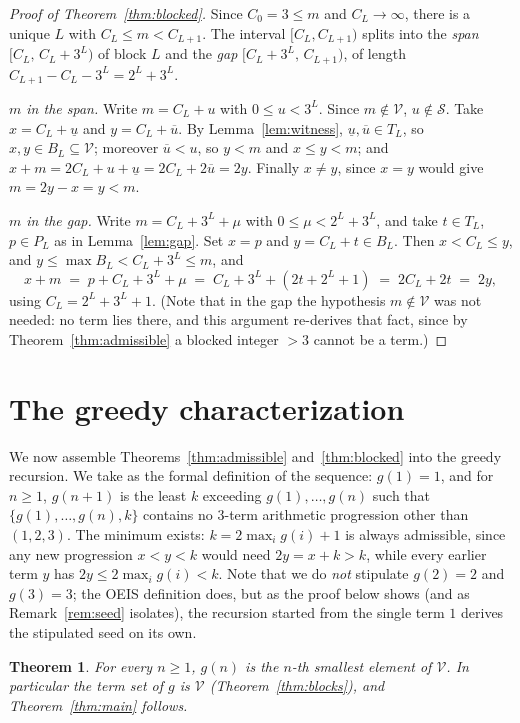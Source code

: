 \documentclass[12pt]{article}
\theoremstyle{plain}
\newtheorem{theorem}{Theorem}
\theoremstyle{definition}
\theoremstyle{remark}
\newcommand{\V}{\mathcal{V}}
\newcommand{\Sd}{\mathcal{S}}
\newcommand{\lo}[1]{\underline{#1}}
\newcommand{\hi}[1]{\overline{#1}}
\begin{document}
\begin{proof}[Proof of Theorem~\ref{thm:blocked}]
Since $C_0=3\leq m$ and $C_L\to\infty$, there is a unique $L$
with $C_L\leq m<C_{L+1}$.  The interval $[C_L,C_{L+1})$ splits
into the \emph{span} $[C_L,\,C_L+3^L)$ of block $L$ and the
\emph{gap} $[C_L+3^L,\,C_{L+1})$, of length
$C_{L+1}-C_L-3^L=2^L+3^L$.

\emph{$m$ in the span.}  Write $m=C_L+u$ with $0\leq u<3^L$.
Since $m\notin\V$, $u\notin\Sd$.  Take
$x=C_L+\lo{u}$ and $y=C_L+\hi{u}$.  By Lemma~\ref{lem:witness},
$\lo{u},\hi{u}\in T_L$, so $x,y\in B_L\subseteq\V$; moreover
$\hi{u}<u$, so $y<m$ and $x\leq y<m$; and
$x+m=2C_L+u+\lo{u}=2C_L+2\hi{u}=2y$.  Finally $x\neq y$, since
$x=y$ would give $m=2y-x=y<m$.

\emph{$m$ in the gap.}  Write $m=C_L+3^L+\mu$ with
$0\leq\mu<2^L+3^L$, and take $t\in T_L$, $p\in P_L$ as in
Lemma~\ref{lem:gap}.  Set $x=p$ and $y=C_L+t\in B_L$.  Then
$x<C_L\leq y$, and $y\leq\max B_L<C_L+3^L\leq m$, and
\[
x+m \;=\; p+C_L+3^L+\mu \;=\; C_L+3^L+(2t+2^L+1)
\;=\; 2C_L+2t \;=\; 2y,
\]
using $C_L=2^L+3^L+1$.  (Note that in the gap the hypothesis
$m\notin\V$ was not needed: no term lies there, and this argument
re-derives that fact, since by Theorem~\ref{thm:admissible} a
blocked integer $>3$ cannot be a term.)
\end{proof}

\section{The greedy characterization}\label{sec:greedy}

We now assemble Theorems~\ref{thm:admissible}
and~\ref{thm:blocked} into the greedy recursion.  We take as the
formal definition of the sequence: $g(1)=1$, and for $n\geq 1$,
$g(n+1)$ is the least $k$ exceeding $g(1),\ldots,g(n)$ such that
$\{g(1),\ldots,g(n),k\}$ contains no $3$-term arithmetic
progression other than $(1,2,3)$.
The minimum exists: $k=2\max_i g(i)+1$ is always admissible,
since any new progression $x<y<k$ would need $2y=x+k>k$, while
every earlier term $y$ has $2y\leq 2\max_i g(i)<k$.  Note that
we do \emph{not} stipulate $g(2)=2$ and $g(3)=3$; the OEIS
definition does, but as the proof below shows (and as
Remark~\ref{rem:seed} isolates), the recursion started from the
single term $1$ derives the stipulated seed on its own.

\begin{theorem}\label{thm:greedy}
For every $n\geq 1$, $g(n)$ is the $n$-th smallest element of
$\V$.  In particular the term set of $g$ is $\V$
(Theorem~\ref{thm:blocks}), and Theorem~\ref{thm:main} follows.
\end{theorem}
\end{document}
